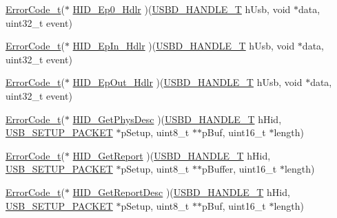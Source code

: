 \begin{DoxyCompactItemize}
\item 
\hyperlink{error_8h_a905255056c349318139d94aa4523d516}{Error\+Code\+\_\+t}($\ast$ \hyperlink{structUSBD__HID__INIT__PARAM_abb727433ef7a7de8566347963d5b8dc0}{H\+I\+D\+\_\+\+Ep0\+\_\+\+Hdlr} )(\hyperlink{group__USBD__Core_gafdbb2204d929cb9d75736bd2b42342ac}{U\+S\+B\+D\+\_\+\+H\+A\+N\+D\+L\+E\+\_\+T} h\+Usb, void $\ast$data, uint32\+\_\+t event)
\item 
\hyperlink{error_8h_a905255056c349318139d94aa4523d516}{Error\+Code\+\_\+t}($\ast$ \hyperlink{structUSBD__HID__INIT__PARAM_ae09f057e4bd6cbcd0ccb981af25bf3fb}{H\+I\+D\+\_\+\+Ep\+In\+\_\+\+Hdlr} )(\hyperlink{group__USBD__Core_gafdbb2204d929cb9d75736bd2b42342ac}{U\+S\+B\+D\+\_\+\+H\+A\+N\+D\+L\+E\+\_\+T} h\+Usb, void $\ast$data, uint32\+\_\+t event)
\item 
\hyperlink{error_8h_a905255056c349318139d94aa4523d516}{Error\+Code\+\_\+t}($\ast$ \hyperlink{structUSBD__HID__INIT__PARAM_a7113e7e66cc2f05e6ae94416ebdde172}{H\+I\+D\+\_\+\+Ep\+Out\+\_\+\+Hdlr} )(\hyperlink{group__USBD__Core_gafdbb2204d929cb9d75736bd2b42342ac}{U\+S\+B\+D\+\_\+\+H\+A\+N\+D\+L\+E\+\_\+T} h\+Usb, void $\ast$data, uint32\+\_\+t event)
\item 
\hyperlink{error_8h_a905255056c349318139d94aa4523d516}{Error\+Code\+\_\+t}($\ast$ \hyperlink{structUSBD__HID__INIT__PARAM_ab2e0f749e7aca1ff28edcf5c8da530a0}{H\+I\+D\+\_\+\+Get\+Phys\+Desc} )(\hyperlink{group__USBD__Core_gafdbb2204d929cb9d75736bd2b42342ac}{U\+S\+B\+D\+\_\+\+H\+A\+N\+D\+L\+E\+\_\+T} h\+Hid, \hyperlink{group__USBD__Core_ga4a940f7627cc7e9f0bb693cc0fce8637}{U\+S\+B\+\_\+\+S\+E\+T\+U\+P\+\_\+\+P\+A\+C\+K\+ET} $\ast$p\+Setup, uint8\+\_\+t $\ast$$\ast$p\+Buf, uint16\+\_\+t $\ast$length)
\item 
\hyperlink{error_8h_a905255056c349318139d94aa4523d516}{Error\+Code\+\_\+t}($\ast$ \hyperlink{structUSBD__HID__INIT__PARAM_a6d109bfb14cb50b59193b1e767dadfce}{H\+I\+D\+\_\+\+Get\+Report} )(\hyperlink{group__USBD__Core_gafdbb2204d929cb9d75736bd2b42342ac}{U\+S\+B\+D\+\_\+\+H\+A\+N\+D\+L\+E\+\_\+T} h\+Hid, \hyperlink{group__USBD__Core_ga4a940f7627cc7e9f0bb693cc0fce8637}{U\+S\+B\+\_\+\+S\+E\+T\+U\+P\+\_\+\+P\+A\+C\+K\+ET} $\ast$p\+Setup, uint8\+\_\+t $\ast$$\ast$p\+Buffer, uint16\+\_\+t $\ast$length)
\item 
\hyperlink{error_8h_a905255056c349318139d94aa4523d516}{Error\+Code\+\_\+t}($\ast$ \hyperlink{structUSBD__HID__INIT__PARAM_ac9a56062199c0f4e294167f89260accb}{H\+I\+D\+\_\+\+Get\+Report\+Desc} )(\hyperlink{group__USBD__Core_gafdbb2204d929cb9d75736bd2b42342ac}{U\+S\+B\+D\+\_\+\+H\+A\+N\+D\+L\+E\+\_\+T} h\+Hid, \hyperlink{group__USBD__Core_ga4a940f7627cc7e9f0bb693cc0fce8637}{U\+S\+B\+\_\+\+S\+E\+T\+U\+P\+\_\+\+P\+A\+C\+K\+ET} $\ast$p\+Setup, uint8\+\_\+t $\ast$$\ast$p\+Buf, uint16\+\_\+t $\ast$length)
$$
\end{DoxyCompactItemize}
